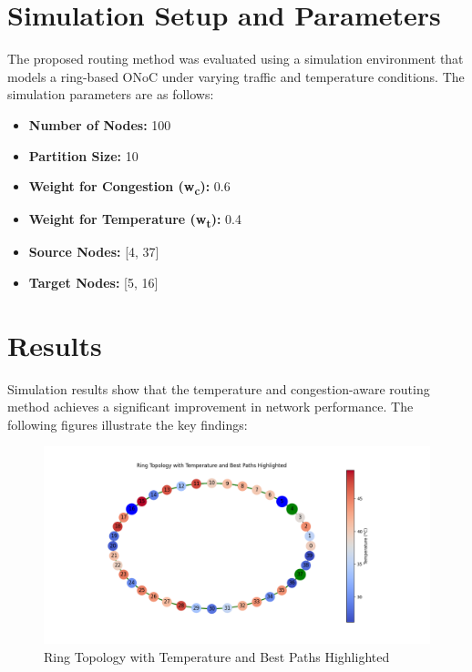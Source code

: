 \documentclass[conference]{IEEEtran}
\begin{document}
\section{Simulation Setup and Parameters}
The proposed routing method was evaluated using a simulation environment that models a ring-based ONoC under varying traffic and temperature conditions. The simulation parameters are as follows:
\begin{itemize}
    \item \textbf{Number of Nodes:} 100
    \item \textbf{Partition Size:} 10
    \item \textbf{Weight for Congestion (w\textsubscript{c}):} 0.6
    \item \textbf{Weight for Temperature (w\textsubscript{t}):} 0.4
    \item \textbf{Source Nodes:} [4, 37]
    \item \textbf{Target Nodes:} [5, 16]
\end{itemize}

\section{Results}
Simulation results show that the temperature and congestion-aware routing method achieves a significant improvement in network performance. The following figures illustrate the key findings:

\begin{figure}[h]
    \centering
    \includegraphics[width=\linewidth]{ring_topology.png}
    \caption{Ring Topology with Temperature and Best Paths Highlighted}
    \label{fig:ring_topology}
\end{figure}
\end{document}
